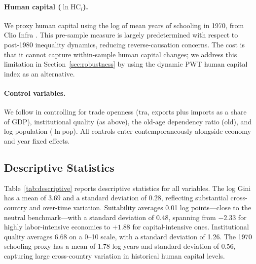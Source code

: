 \documentclass[12pt]{article}
\newcommand{\hc}{\mathrm{HC}}
\begin{document}
\paragraph{Human capital (\(\ln \hc_{i}\)).}
We proxy human capital using the log of mean years of schooling
in 1970, from Clio Infra \citep{li2026prosperity}.
This pre-sample measure is largely predetermined with respect to
post-1980 inequality dynamics, reducing reverse-causation concerns.
The cost is that it cannot capture within-sample human capital
changes; we address this limitation in Section~\ref{sec:robustness}
by using the dynamic PWT human capital index as an alternative.

\paragraph{Control variables.}
We follow \citet{li2026prosperity} in controlling for trade openness
(\(\mathrm{tra}\), exports plus imports as a share of GDP),
institutional quality (as above), the old-age dependency ratio
(\(\mathrm{old}\)), and log population (\(\ln \mathrm{pop}\)).
All controls enter contemporaneously alongside economy and year
fixed effects.

\subsection{Descriptive Statistics}

Table~\ref{tab:descriptive} reports descriptive statistics for all
variables.
The log Gini has a mean of 3.69 and a standard deviation of 0.28,
reflecting substantial cross-country and over-time variation.
Suitability averages 0.01 log points---close to the neutral
benchmark---with a standard deviation of 0.48, spanning from
$-2.33$ for highly labor-intensive economies to $+1.88$ for
capital-intensive ones.
Institutional quality averages 6.68 on a 0--10 scale,
with a standard deviation of 1.26.
The 1970 schooling proxy has a mean of 1.78 log years and
standard deviation of 0.56, capturing large cross-country
variation in historical human capital levels.
\end{document}
